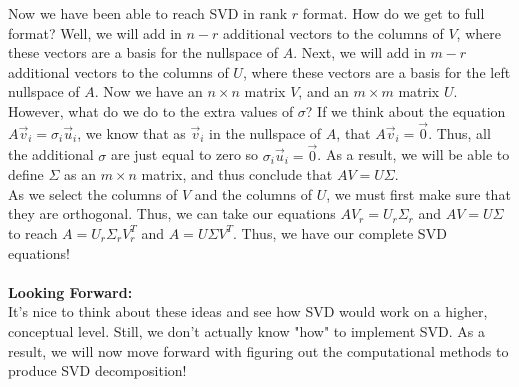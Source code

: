 \documentclass[12pt]{amsart}
\begin{document}
Now we have been able to reach SVD in rank $r$ format. How do we get to full format? Well, we will add in $n-r$ additional vectors to the columns of $V$, where these vectors are a basis for the nullspace of $A$. Next, we will add in $m-r$ additional vectors to the columns of $U$, where these vectors are a basis for the left nullspace of $A$. Now we have an $n \times n$ matrix $V$, and an $m \times m$ matrix $U$. However, what do we do to the extra values of $\sigma$? If we think about the equation $A\vec{v}_i = \sigma_i \vec{u}_i$, we know that as $\vec{v}_i$ in the nullspace of $A$, that $A\vec{v}_i = \vec{0}$. Thus, all the additional $\sigma$ are just equal to zero so $\sigma_i \vec{u}_i = \vec{0}$. As a result, we will be able to define $\Sigma$ as an $m \times n$ matrix, and thus conclude that $AV = U\Sigma$.\\
As we select the columns of $V$ and the columns of $U$, we must first make sure that they are orthogonal. 
Thus, we can take our equations $AV_r = U_r\Sigma_r$ and $AV = U\Sigma$ to reach $A = U_r\Sigma_r V_r^T$ and $A = U\Sigma V^T$. Thus, we have our complete SVD equations!\\
\\
\textbf{Looking Forward:}\\
It's nice to think about these ideas and see how SVD would work on a higher, conceptual level. Still, we don't actually know "how" to implement SVD. As a result, we will now move forward with figuring out the computational methods to produce SVD decomposition!
\end{document}
